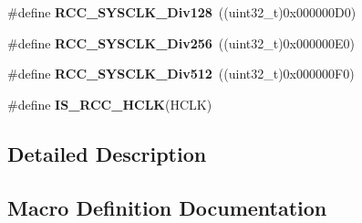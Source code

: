 \begin{DoxyCompactItemize}
\item 
\hypertarget{group___r_c_c___a_h_b___clock___source_ga1a28926fcb86112058a365e01fe9a46b}{}\#define {\bfseries R\+C\+C\+\_\+\+S\+Y\+S\+C\+L\+K\+\_\+\+Div128}~((uint32\+\_\+t)0x000000\+D0)\label{group___r_c_c___a_h_b___clock___source_ga1a28926fcb86112058a365e01fe9a46b}

\item 
\hypertarget{group___r_c_c___a_h_b___clock___source_gaa28bb876893b3267a813fc98a462d5ee}{}\#define {\bfseries R\+C\+C\+\_\+\+S\+Y\+S\+C\+L\+K\+\_\+\+Div256}~((uint32\+\_\+t)0x000000\+E0)\label{group___r_c_c___a_h_b___clock___source_gaa28bb876893b3267a813fc98a462d5ee}

\item 
\hypertarget{group___r_c_c___a_h_b___clock___source_gab5b4588c455d6327bc96f131ed6698ab}{}\#define {\bfseries R\+C\+C\+\_\+\+S\+Y\+S\+C\+L\+K\+\_\+\+Div512}~((uint32\+\_\+t)0x000000\+F0)\label{group___r_c_c___a_h_b___clock___source_gab5b4588c455d6327bc96f131ed6698ab}

\item 
\#define {\bfseries I\+S\+\_\+\+R\+C\+C\+\_\+\+H\+C\+L\+K}(H\+C\+L\+K)
\end{DoxyCompactItemize}


\subsection{Detailed Description}


\subsection{Macro Definition Documentation}
\hypertarget{group___r_c_c___a_h_b___clock___source_ga6e9f1c193a2f41bcb3c2f7fa8459b5b3}{}
